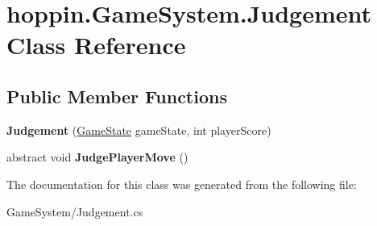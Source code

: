 \hypertarget{classhoppin_1_1_game_system_1_1_judgement}{}\section{hoppin.\+Game\+System.\+Judgement Class Reference}
\label{classhoppin_1_1_game_system_1_1_judgement}
\subsection*{Public Member Functions}
\begin{DoxyCompactItemize}
\item 
{\bfseries Judgement} (\hyperlink{classhoppin_1_1_game_system_1_1_game_state}{Game\+State} game\+State, int player\+Score)\hypertarget{classhoppin_1_1_game_system_1_1_judgement_a69f21fd0959cfd8a41e79fced24d0768}{}\label{classhoppin_1_1_game_system_1_1_judgement_a69f21fd0959cfd8a41e79fced24d0768}

\item 
abstract void {\bfseries Judge\+Player\+Move} ()\hypertarget{classhoppin_1_1_game_system_1_1_judgement_ac2aedd52103fdf68766390f2fb4487a3}{}\label{classhoppin_1_1_game_system_1_1_judgement_ac2aedd52103fdf68766390f2fb4487a3}

\end{DoxyCompactItemize}


The documentation for this class was generated from the following file\+:\begin{DoxyCompactItemize}
\item 
Game\+System/Judgement.\+cs\end{DoxyCompactItemize}
